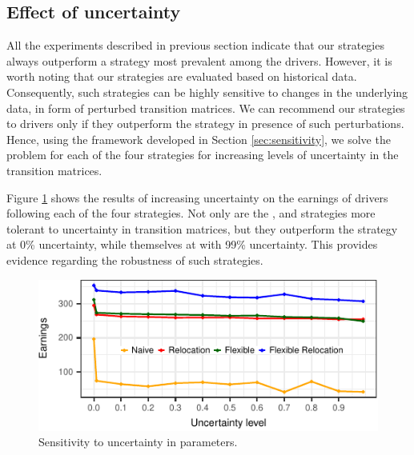 \subsection{Effect of uncertainty} 

All the experiments described in previous section indicate that our strategies always outperform a {\naive} strategy most prevalent among the drivers. However, it is worth noting that our strategies are evaluated based on historical data. Consequently, such strategies can be highly sensitive to changes in the underlying data, in form of perturbed transition matrices. We can recommend our strategies to drivers only if they outperform the {\naive} strategy in presence of such perturbations. Hence, using the framework developed in Section \ref{sec:sensitivity}, we solve the {\robustproblem} problem for each of the four strategies for increasing levels of uncertainty in the transition matrices.

Figure \ref{fig:uncertainty_evolution} shows the results of increasing uncertainty on the earnings of drivers following each of the four strategies. Not only are the {\relocation}, {\flexible} and {\relocationflexible} strategies more tolerant to uncertainty in transition matrices, but they outperform the {\naive} strategy at 0\% uncertainty, while themselves at with 99\% uncertainty. This provides evidence regarding the robustness of such strategies.

\begin{figure}[H]
	\centering
	\includegraphics{figures/uncertainty_evolution.pdf}
	\caption{Sensitivity to uncertainty in parameters.}
	\label{fig:uncertainty_evolution}
\end{figure}

